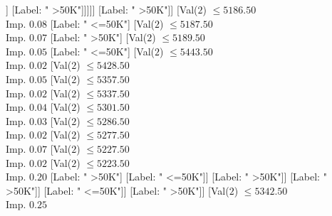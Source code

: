 \documentclass[margin=10pt]{standalone}
\begin{document}
\begin{forest}
																																[Label: " >50K"]
																																[Val($2$) $ \leq 4994.50$ \\ Imp. $0.09$
																																	[Label: " <=50K"]
																																	[Val($2$) $ \leq 5118.50$ \\ Imp. $0.02$
																																		[Val($2$) $ \leq 5104.50$ \\ Imp. $0.02$
																																			[Label: " >50K"]
																																			[Label: " <=50K"]]
																																		[Label: " >50K"]]]]]
																														[Label: " >50K"]]
																													[Val($2$) $ \leq 5186.50$ \\ Imp. $0.08$
																														[Label: " <=50K"]
																														[Val($2$) $ \leq 5187.50$ \\ Imp. $0.07$
																															[Label: " >50K"]
																															[Val($2$) $ \leq 5189.50$ \\ Imp. $0.05$
																																[Label: " <=50K"]
																																[Val($2$) $ \leq 5443.50$ \\ Imp. $0.02$
																																	[Val($2$) $ \leq 5428.50$ \\ Imp. $0.05$
																																		[Val($2$) $ \leq 5357.50$ \\ Imp. $0.02$
																																			[Val($2$) $ \leq 5337.50$ \\ Imp. $0.04$
																																				[Val($2$) $ \leq 5301.50$ \\ Imp. $0.03$
																																					[Val($2$) $ \leq 5286.50$ \\ Imp. $0.02$
																																						[Val($2$) $ \leq 5277.50$ \\ Imp. $0.07$
																																							[Val($2$) $ \leq 5227.50$ \\ Imp. $0.02$
																																								[Val($2$) $ \leq 5223.50$ \\ Imp. $0.20$
																																									[Label: " >50K"]
																																									[Label: " <=50K"]]
																																								[Label: " >50K"]]
																																							[Label: " >50K"]]
																																						[Label: " <=50K"]]
																																					[Label: " >50K"]]
																																				[Val($2$) $ \leq 5342.50$ \\ Imp. $0.25$

\end{forest}
\end{document}
